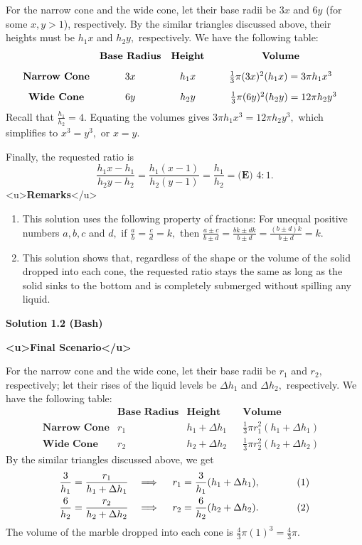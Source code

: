 \begin{enumerate}
 For the narrow cone and the wide cone, let their base radii be $3x$ and $6y$ (for some $x,y>1$), respectively. By the similar triangles discussed above, their heights must be $h_1x$ and $h_2y,$ respectively. We have the following table:
 \[\begin{array}{cccccc} & \textbf{Base Radius} & \textbf{Height} & & \textbf{Volume} & \\ [2ex] \textbf{Narrow Cone} & 3x & h_1x & & \frac13\pi(3x)^2(h_1x)=3\pi h_1 x^3 & \\ [2ex] \textbf{Wide Cone} & 6y & h_2y & & \hspace{2.0625mm}\frac13\pi(6y)^2(h_2y)=12\pi h_2 y^3 & \end{array}\]Recall that $\frac{h_1}{h_2}=4.$ Equating the volumes gives $3\pi h_1 x^3=12\pi h_2 y^3,$ which simplifies to $x^3=y^3,$ or $x=y.$

 Finally, the requested ratio is 
 \[\frac{h_1 x - h_1}{h_2 y - h_2}=\frac{h_1 (x-1)}{h_2 (y-1)}=\frac{h_1}{h_2}=\boxed{\textbf{(E) }4:1}.\]<u>\textbf{Remarks}</u>

            \begin{enumerate} 
        \item This solution uses the following property of fractions:  For unequal positive numbers $a,b,c$ and $d,$ if $\frac ab = \frac cd = k,$ then $\frac{a\pm c}{b\pm d}=\frac{bk\pm dk}{b\pm d}=\frac{(b\pm d)k}{b\pm d}=k.$


        \item This solution shows that, regardless of the shape or the volume of the solid dropped into each cone, the requested ratio stays the same as long as the solid sinks to the bottom and is completely submerged without spilling any liquid.

            \end{enumerate}
            



\textbf{Solution 1.2 (Bash)}

\textbf{<u>Final Scenario</u>}

 For the narrow cone and the wide cone, let their base radii be $r_1$ and $r_2,$ respectively; let their rises of the liquid levels be $\Delta h_1$ and $\Delta h_2,$ respectively. We have the following table:
 \[\begin{array}{cccccc} & \textbf{Base Radius} & \textbf{Height} & & \textbf{Volume} & \\ [2ex]  \textbf{Narrow Cone} & r_1 & h_1+\Delta h_1 & & \frac13\pi r_1^2(h_1+\Delta h_1) & \\ [2ex]  \textbf{Wide Cone} & r_2 & h_2+\Delta h_2 & & \frac13\pi r_2^2(h_2+\Delta h_2) & \end{array}\]By the similar triangles discussed above, we get
 \begin{align*} \frac{3}{h_1}&=\frac{r_1}{h_1+\Delta h_1} &\implies \quad r_1&=\frac{3}{h_1}(h_1+\Delta h_1), & \hspace{10mm} (1) \\ \frac{6}{h_2}&=\frac{r_2}{h_2+\Delta h_2} &\implies \quad r_2&=\frac{6}{h_2}(h_2+\Delta h_2). & (2) \end{align*}
The volume of the marble dropped into each cone is $\frac43\pi(1)^3=\frac43\pi.$


\end{enumerate}
